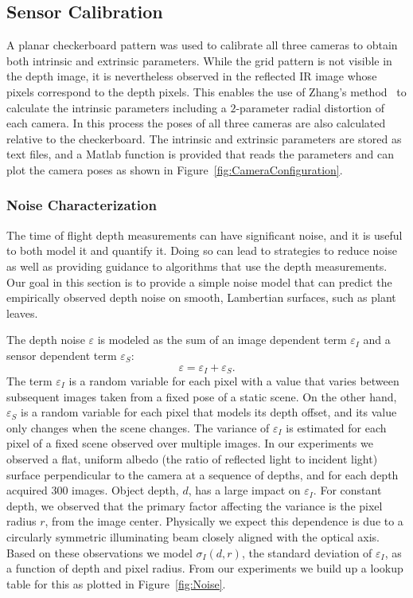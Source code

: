

\subsection{Sensor Calibration}

A planar checkerboard pattern was used to calibrate all three cameras to obtain both intrinsic and extrinsic parameters.
While the grid pattern is not visible in the depth image, it is nevertheless observed in the reflected IR image whose pixels correspond to the depth pixels.
This enables the use of Zhang's method~\cite{Zhang2000} to calculate the intrinsic parameters including a $2$-parameter radial distortion of each camera.
In this process the poses of all three cameras are also calculated relative to the checkerboard.
The intrinsic and extrinsic parameters are stored as text files, and a Matlab function is provided that reads the parameters and can plot the camera poses as shown in Figure~\ref{fig:CameraConfiguration}.


\subsubsection{Noise Characterization}
\label{sec:bias}

The time of flight depth measurements can have significant noise, and it is useful to both model it and quantify it.
Doing so can lead to strategies to reduce noise as well as providing guidance to algorithms that use the depth measurements.
Our goal in this section is to provide a simple noise model that can predict the empirically observed depth noise on smooth, Lambertian surfaces, such as plant leaves.

The depth noise $\varepsilon$ is modeled as the sum of an image dependent term $\varepsilon_I$ and a sensor dependent term $\varepsilon_S$:
\begin{equation}
\varepsilon = \varepsilon_I + \varepsilon_S. \label{eq:epsilon}
\end{equation}
The term $\varepsilon_I$ is a random variable for each pixel with a value that varies between subsequent images taken from a fixed pose of a static scene.
On the other hand, $\varepsilon_S$ is a random variable for each pixel that models its depth offset, and its value only changes when the scene changes.
The variance of $\varepsilon_I$ is estimated for each pixel of a fixed scene observed over multiple images.
In our experiments we observed a flat, uniform albedo (the ratio of reflected light to incident light) surface perpendicular to the camera at a sequence of depths, and for each depth acquired $300$ images.
Object depth, $d$, has a large impact on $\varepsilon_I$.
For constant depth, we observed that the primary factor affecting the variance is the pixel radius $r$, from the image center.
Physically we expect this dependence is due to a circularly symmetric illuminating beam closely aligned with the optical axis.
Based on these observations we model $\sigma_I(d,r)$, the standard deviation of $\varepsilon_I$, as a function of depth and pixel radius.
From our experiments we build up a lookup table for this as plotted in Figure~\ref{fig:Noise}.

